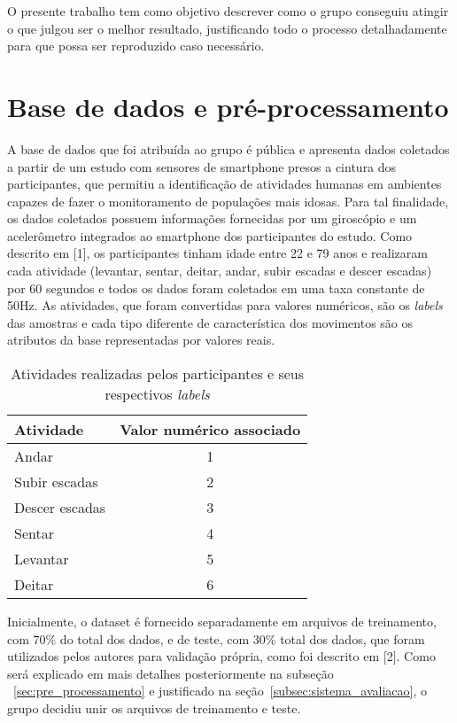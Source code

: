 \documentclass[10pt, conference, compsocconf]{IEEEtran}
\begin{document}
O presente trabalho tem como objetivo descrever como o grupo conseguiu atingir o
que julgou ser o melhor resultado, justificando todo o processo detalhadamente
para que possa ser reproduzido caso necessário. 


\section{Base de dados e pré-processamento}\label{sec:base_dados}
A base de dados que foi atribuída ao grupo é pública e apresenta dados coletados 
a partir de um estudo com sensores de smartphone presos a cintura dos
participantes, que permitiu a identificação de atividades humanas em ambientes 
capazes de fazer o monitoramento de populações mais idosas. 
Para tal finalidade, os dados coletados possuem informações fornecidas por um 
giroscópio e um acelerômetro integrados ao smartphone dos participantes do estudo. 
Como descrito em [1], os participantes tinham idade entre 22 e 79 anos e 
realizaram cada atividade (levantar, sentar, deitar, andar, subir escadas e 
descer escadas) por 60 segundos e todos os dados foram coletados em uma taxa 
constante de 50Hz. As atividades, que foram convertidas para valores numéricos, 
são os \textsl{labels} das amostras e cada tipo diferente de característica 
dos movimentos são os atributos da base representadas por valores reais.\newline

\begin{table}[h]
\begin{center}
    \begin{tabular}{| l | c |}
        \hline
        Atividade & Valor numérico associado\\
        \hline
        Andar & 1\\
        Subir escadas & 2\\
        Descer escadas & 3\\
        Sentar & 4\\
        Levantar & 5\\
        Deitar & 6\\
        \hline
    \end{tabular}
    \caption{Atividades realizadas pelos participantes e seus respectivos
    \textsl{labels}}\label{tab:labels}
\end{center}
\end{table}

Inicialmente, o dataset é fornecido separadamente em arquivos de 
treinamento, com 70\% do total dos dados, e de teste, com 30\% total dos dados, 
que foram utilizados pelos autores para validação própria, como foi descrito em 
[2]. Como será explicado em mais detalhes posteriormente na subseção
~\ref{sec:pre_processamento} e justificado na
seção~\ref{subsec:sistema_avaliacao}, o grupo decidiu unir os arquivos de treinamento e teste. 
\end{document}
